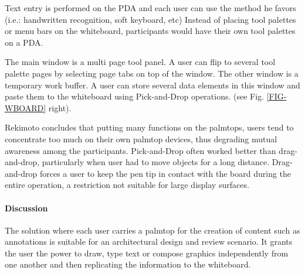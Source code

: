 Text entry is performed on the PDA and each user can use the method he favors
(i.e.: handwritten recognition, soft keyboard, etc)
Instead of placing tool palettes or menu bars on the whiteboard, participants would have their own
tool palettes on a PDA.

The main window is a multi page tool panel. A user can flip to several tool palette
pages by selecting page tabs on top of the window.
The other window is a temporary work buffer. A user can store several data elements in this window
and paste them to the whiteboard using Pick-and-Drop operations. (see Fig. \ref{FIG-WBOARD} right).

Rekimoto concludes that putting many functions on the palmtops, users tend to concentrate too much
on their own palmtop devices, thus degrading mutual awareness among the participants.
Pick-and-Drop often worked better than drag-and-drop, particularly when user had to move objects
for a long distance. Drag-and-drop forces a user to keep the pen tip in contact with the board
during the entire operation, a restriction not suitable for large display surfaces.

\paragraph{Discussion}
\label{sec:Discussion}

The solution where each user carries a palmtop for the creation of content such as annotations
is suitable for an architectural design and review scenario. It grants the user the power to
draw, type text or compose graphics independently from one another and then replicating the
information to the whiteboard.